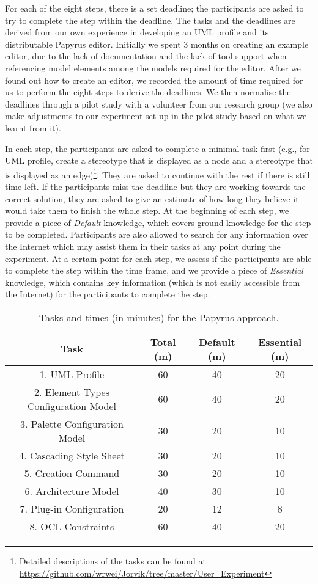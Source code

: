 For each of the eight steps, there is a set deadline; the participants are asked to try to complete the step within the deadline.
The tasks and the deadlines are derived from our own experience in developing an UML profile and its distributable Papyrus editor. 
Initially we spent 3 months on creating an example editor, due to the lack of documentation and the lack of tool support when referencing model elements among the models required for the editor.
After we found out how to create an editor, we recorded the amount of time required for us to perform the eight steps to derive the deadlines. 
We then normalise the deadlines through a pilot study with a volunteer from our research group (we also make adjustments to our experiment set-up in the pilot study based on what we learnt from it). 

In each step, the participants are asked to complete a minimal task first (e.g., for UML profile, create a stereotype that is displayed as a node and a stereotype that is displayed as an edge)\footnote{Detailed descriptions of the tasks can be found at \url{https://github.com/wrwei/Jorvik/tree/master/User_Experiment}}. 
They are asked to continue with the rest if there is still time left. 
If the participants miss the deadline but they are working towards the correct solution, they are asked to give an estimate of how long they believe it would take them to finish the whole step.
At the beginning of each step, we provide a piece of \textit{Default} knowledge, which covers ground knowledge for the step to be completed. 
Participants are also allowed to search for any information over the Internet which may assist them in their tasks at any point during the experiment.
At a certain point for each step, we assess if the participants are able to complete the step within the time frame, and we provide a piece of \textit{Essential} knowledge, which contains key information (which is not easily accessible from the Internet) for the participants to complete the step.

\begin{table}
	\centering
	\setlength{\tabcolsep}{3.5pt} 
	\caption{Tasks and times (in minutes) for the Papyrus approach.}
	\begin{tabular}{|c|c|c|c|}
		\cline{1-4}
		\textbf{Task} & Total (m) & Default (m) & Essential (m) \\ \hline
		1. UML Profile & 60 & 40 & 20 \\ \hline
		2. Element Types Configuration Model & 60 & 40 & 20 \\ \hline
		3. Palette Configuration Model & 30 & 20 & 10 \\ \hline
		4. Cascading Style Sheet & 30 & 20 & 10 \\ \hline
		5. Creation Command & 30 & 20 & 10 \\ \hline
		6. Architecture Model & 40 & 30 & 10 \\ \hline
		7. Plug-in Configuration & 20 & 12 & 8 \\ \hline
		8. OCL Constraints & 60 & 40 & 20 \\ \hline
	\end{tabular}
	\label{tab:manual}
\end{table}


